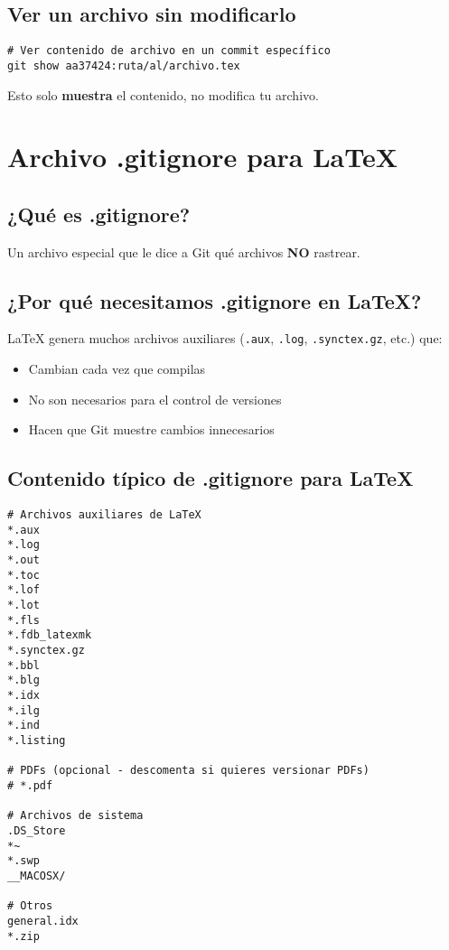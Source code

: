 \documentclass[11pt,a4paper]{article}
\begin{document}
\subsection{Ver un archivo sin modificarlo}

\begin{lstlisting}[style=bashstyle]
# Ver contenido de archivo en un commit específico
git show aa37424:ruta/al/archivo.tex
\end{lstlisting}

Esto solo \textbf{muestra} el contenido, no modifica tu archivo.

\section{Archivo .gitignore para LaTeX}

\subsection{¿Qué es .gitignore?}

Un archivo especial que le dice a Git qué archivos \textbf{NO} rastrear.

\subsection{¿Por qué necesitamos .gitignore en LaTeX?}

LaTeX genera muchos archivos auxiliares (\texttt{.aux}, \texttt{.log}, \texttt{.synctex.gz}, etc.) que:
\begin{itemize}
  \item Cambian cada vez que compilas
  \item No son necesarios para el control de versiones
  \item Hacen que Git muestre cambios innecesarios
\end{itemize}

\subsection{Contenido típico de .gitignore para LaTeX}

\begin{lstlisting}[style=bashstyle]
# Archivos auxiliares de LaTeX
*.aux
*.log
*.out
*.toc
*.lof
*.lot
*.fls
*.fdb_latexmk
*.synctex.gz
*.bbl
*.blg
*.idx
*.ilg
*.ind
*.listing

# PDFs (opcional - descomenta si quieres versionar PDFs)
# *.pdf

# Archivos de sistema
.DS_Store
*~
*.swp
__MACOSX/

# Otros
general.idx
*.zip
\end{lstlisting}
\end{document}
